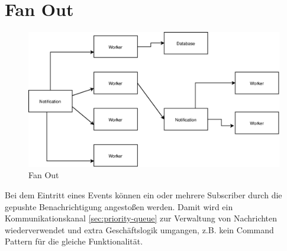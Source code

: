 \documentclass[
12pt,
english,
ngerman,
headsepline,
twoside,
openright,
numbers=noenddot,version=first
]{scrreprt}
\begin{document}
\section{Fan Out}
\label{sec:fan-out}
\begin{figure}[H]
	\centering
\includegraphics[scale=0.60]{./pics/pattern-fan-out.eps}
\caption{Fan Out}
\label{pic:fan-out}
\end{figure}
Bei dem Eintritt eines Events können ein oder mehrere Subscriber durch die gepushte Benachrichtigung angestoßen werden. Damit wird ein Kommunikationskanal  \autoref{sec:priority-queue} zur Verwaltung von Nachrichten wiederverwendet und extra Geschäftslogik umgangen, z.B. kein Command Pattern für die gleiche Funktionalität\cite{serverlessArchAWS}.
\end{document}
